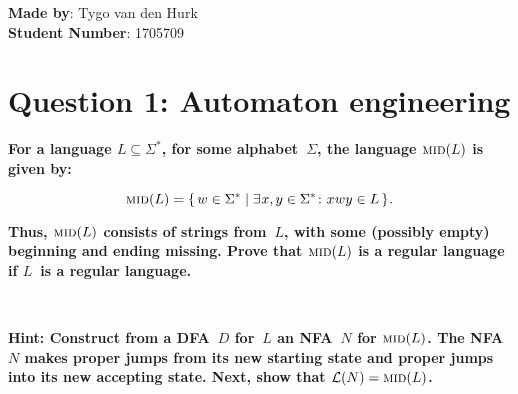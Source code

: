 \documentclass[a4paper]{article}
\newcommand{\Mid}{\textsc{mid}}
\newcommand{\calL}{\mathcal{L}}
\begin{document}
    
    \textbf{Made by}: Tygo van den Hurk \\
    \textbf{Student Number}: 1705709 \\
    
    \section*{Question 1: Automaton engineering}
    
        \textbf{For a language $L \subseteq \Sigma^\ast$, for some alphabet~$\Sigma$, the language $\Mid(L)$ is given by:}
        
        \begin{displaymath}
          \Mid(L) =
          \lbrace \, w \in \Sigma^\ast \mid
          \exists \mkern1mu x,y \in \Sigma^\ast \colon
          x \mkern0.5mu wy \in L
          \, \rbrace \mkern1mu .
        \end{displaymath}
        
        \textbf{Thus, $\Mid(L)$ consists of strings from~$L$, with some (possibly empty) beginning and ending missing. Prove that $\Mid(L)$ is a regular language if $L$~is a regular language.}
        
        \\\medskip
        
        \textbf{Hint: Construct from a DFA~$D$ for~$L$ an NFA~$N$ for $\Mid(L)$. The NFA $N$ makes proper jumps from its new starting state and proper jumps into its new accepting state. Next, show that $\calL(N) = \Mid(L)$.}
        
\end{document}
